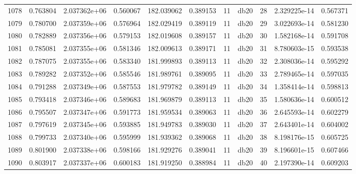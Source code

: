 \begin{tabular}{lrrrrrrlrrr}
1078 &    0.763804 &        2.037362e+06 &  0.560067 &              182.039062 &    0.389153 &      11 &         db20 &     28 &   2.329225e-14 &      0.567371 \\
1079 &    0.780700 &        2.037359e+06 &  0.576964 &              182.029419 &    0.389119 &      11 &         db20 &     29 &   3.022693e-14 &      0.581230 \\
1080 &    0.782889 &        2.037356e+06 &  0.579153 &              182.019608 &    0.389157 &      11 &         db20 &     30 &   1.582168e-14 &      0.591708 \\
1081 &    0.785081 &        2.037355e+06 &  0.581346 &              182.009613 &    0.389171 &      11 &         db20 &     31 &   8.780603e-15 &      0.593538 \\
1082 &    0.787075 &        2.037355e+06 &  0.583340 &              181.999893 &    0.389113 &      11 &         db20 &     32 &   2.308036e-14 &      0.595292 \\
1083 &    0.789282 &        2.037352e+06 &  0.585546 &              181.989761 &    0.389095 &      11 &         db20 &     33 &   2.789465e-14 &      0.597035 \\
1084 &    0.791288 &        2.037349e+06 &  0.587553 &              181.979782 &    0.389149 &      11 &         db20 &     34 &   1.358414e-14 &      0.598813 \\
1085 &    0.793418 &        2.037346e+06 &  0.589683 &              181.969879 &    0.389113 &      11 &         db20 &     35 &   1.580636e-14 &      0.600512 \\
1086 &    0.795507 &        2.037347e+06 &  0.591773 &              181.959534 &    0.389063 &      11 &         db20 &     36 &   2.645593e-14 &      0.602279 \\
1087 &    0.797619 &        2.037345e+06 &  0.593885 &              181.949783 &    0.389030 &      11 &         db20 &     37 &   2.643401e-14 &      0.604002 \\
1088 &    0.799733 &        2.037340e+06 &  0.595999 &              181.939362 &    0.389068 &      11 &         db20 &     38 &   8.198176e-15 &      0.605725 \\
1089 &    0.801900 &        2.037338e+06 &  0.598166 &              181.929276 &    0.389041 &      11 &         db20 &     39 &   8.196601e-15 &      0.607466 \\
1090 &    0.803917 &        2.037337e+06 &  0.600183 &              181.919250 &    0.388984 &      11 &         db20 &     40 &   2.197390e-14 &      0.609203 \\

\end{tabular}
